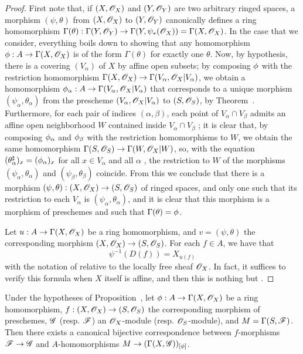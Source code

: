 \begin{proof}
First note that, if $(X,\mathscr{O}_X)$ and $(Y,\mathscr{O}_Y)$ are two arbitrary ringed spaces,
a morphism $(\psi,\theta)$ from $(X,\mathscr{O}_X)$ to $(Y,\mathscr{O}_Y)$ canonically defines a ring homomorphism $\Gamma(\theta):\Gamma(Y,\OO_Y)\to\Gamma(Y,\psi_*(\OO_X))=\Gamma(X,\OO_X)$.
In the case that we consider, everything boils down to showing that any homomorphism $\vphi:A\to\Gamma(X,\OO_X)$ is of the form $\Gamma(\theta)$ for exactly one $\theta$.
Now, by hypothesis, there is a covering $(V_\alpha)$ of $X$ by affine open subsets;
by composing $\phi$ with the restriction homomorphism $\Gamma(X,\OO_X)\to\Gamma(V_\alpha,\OO_X|V_\alpha)$, we obtain a homomorphism $\vphi_\alpha:A\to\Gamma(V_\alpha,\OO_X|V_\alpha)$ that corresponds to a unique morphism $(\psi_\alpha,\theta_\alpha)$ from the prescheme $(V_\alpha,\mathscr{O}_X|V_\alpha)$ to $(S,\mathscr{O}_S)$, by Theorem~.
Furthermore, for each pair of indices $(\alpha,\beta)$, each point of $V_\alpha\cap V_\beta$ admits an affine open neighborhood $W$ contained inside $V_\alpha\cap V_\beta$ ;
it is clear that, by composing $\phi_\alpha$ and $\phi_\beta$ with the restriction homomorphisms to $W$, we obtain the same homomorphism $\Gamma(S,\OO_S)\to\Gamma(W,\OO_X|W)$, so, with the equation $(\theta_\alpha^\sharp)_x=(\phi_\alpha)_x$ for all $x\in V_\alpha$ and all $\alpha$ , the restriction to $W$ of the morphisms $(\psi_\alpha,\theta_\alpha)$ and $(\psi_\beta,\theta_\beta)$ coincide.
From this we conclude that there is a morphism $(\psi,\theta):(X,\OO_X)\to(S,\OO_S)$ of ringed spaces, and only one such that its restriction to each $V_\alpha$ is $(\psi_\alpha,\theta_\alpha)$, and it is clear that this morphism is a morphism of preschemes and such that $\Gamma(\theta)=\phi$.

Let $u:A\to\Gamma(X,\OO_X)$ be a ring homomorphism, and $v=(\psi,\theta)$ the corresponding morphism $(X,\OO_X)\to(S,\OO_S)$.
For each $f\in A$, we have that
\begin{equation*}
  \label{1.2.2.4.1}
  \psi^{-1}(D(f))=X_{u(f)}
  \tag{2.2.4.1}
\end{equation*}
with the notation of  relative to the locally free sheaf $\mathscr{O}_X$.
In fact, it suffices to verify this formula when $X$ itself is affine, and then this is nothing but .
\end{proof}

\begin{prop}[2.2.5]
\label{1.2.2.5}
Under the hypotheses of Proposition~, let $\vphi:A\to\Gamma(X,\OO_X)$ be a ring homomorphism, $f:(X,\OO_X)\to(S,\OO_S)$ the corresponding morphism of preschemes, $\mathscr{G}$ (resp. $\mathscr{F}$) an $\mathscr{O}_X$-module (resp. $\mathscr{O}_S$-module), and $M=\Gamma(S,\mathscr{F})$.
Then there exists a canonical bijective
correspondence between $f$-morphisms $\sh{F}\to\sh{G}$  and $A$-homomorphisms $M\to(\Gamma(X,\sh{G}))_{[\vphi]}$.
\end{prop}

